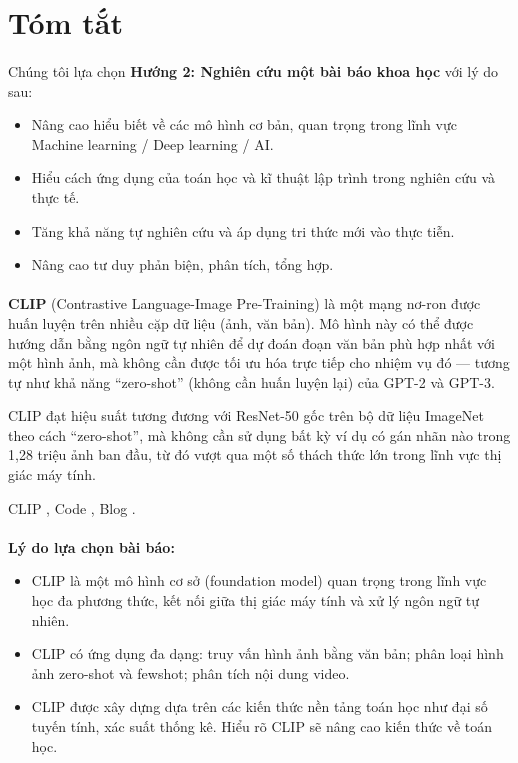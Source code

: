 \section{Tóm tắt}

\paragraph{}{Chúng tôi lựa chọn \textbf{Hướng 2: Nghiên cứu một bài báo khoa học} với lý do sau:}

\begin{itemize}
    \item Nâng cao hiểu biết về các mô hình cơ bản, quan trọng trong lĩnh vực Machine learning / Deep learning / AI. 
    \item Hiểu cách ứng dụng của toán học và kĩ thuật lập trình trong nghiên cứu và thực tế.
    \item Tăng khả năng tự nghiên cứu và áp dụng tri thức mới vào thực tiễn.
    \item Nâng cao tư duy phản biện, phân tích, tổng hợp.
\end{itemize}

\paragraph{}{\textbf{CLIP} \cite{radford2021learning} (Contrastive Language-Image Pre-Training) là một mạng nơ-ron được huấn luyện trên nhiều cặp dữ liệu (ảnh, văn bản). Mô hình này có thể được hướng dẫn bằng ngôn ngữ tự nhiên để dự đoán đoạn văn bản phù hợp nhất với một hình ảnh, mà không cần được tối ưu hóa trực tiếp cho nhiệm vụ đó — tương tự như khả năng “zero-shot” (không cần huấn luyện lại) của GPT-2 và GPT-3.

CLIP đạt hiệu suất tương đương với ResNet-50 gốc trên bộ dữ liệu ImageNet theo cách “zero-shot”, mà không cần sử dụng bất kỳ ví dụ có gán nhãn nào trong 1,28 triệu ảnh ban đầu, từ đó vượt qua một số thách thức lớn trong lĩnh vực thị giác máy tính.

CLIP \cite{radford2021learning}, Code \cite{code_clip}, Blog \cite{blog_clip}.
}

\paragraph{}{\textbf{Lý do lựa chọn bài báo:}}

\begin{itemize}
    \item CLIP là một mô hình cơ sở (foundation model) quan trọng trong lĩnh vực học đa phương thức, kết nối giữa thị giác máy tính và xử lý ngôn ngữ tự nhiên.
    \item CLIP có ứng dụng đa dạng: truy vấn hình ảnh bằng văn bản; phân loại hình ảnh zero-shot và fewshot; phân tích nội dung video.
    \item CLIP được xây dựng dựa trên các kiến thức nền tảng toán học như đại số tuyến tính, xác suất thống kê. Hiểu rõ CLIP sẽ nâng cao kiến thức về toán học.
\end{itemize}

